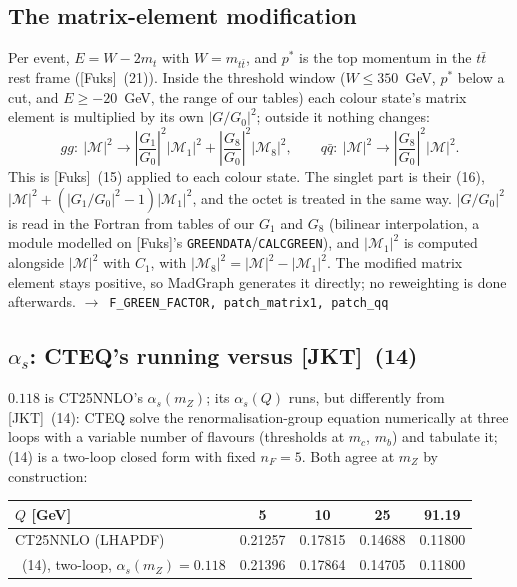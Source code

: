\documentclass[11pt]{article}
\newcommand{\code}[1]{\texttt{#1}}
\newcommand{\alphas}{\alpha_s}
\newcommand{\JKT}{[JKT]}
\newcommand{\Fuks}{[Fuks]}
\newcommand{\fn}[1]{\hfill$\to$~\code{#1}}
\begin{document}
\subsection{The matrix-element modification}
Per event, $E=W-2m_t$ with $W=m_{t\bar t}$, and $p^*$ is the top momentum in the $t\bar t$ rest frame (\Fuks\ (21)). Inside the
threshold window ($W\le350$~GeV, $p^*$ below a cut, and $E\ge-20$~GeV, the range of our tables) each colour state's matrix
element is multiplied by its own $|G/G_0|^2$; outside it nothing changes:
$$
gg:\ |\mathcal M|^2\to\left|\frac{G_1}{G_0}\right|^2|\mathcal M_1|^2+\left|\frac{G_8}{G_0}\right|^2|\mathcal M_8|^2,\qquad
q\bar q:\ |\mathcal M|^2\to\left|\frac{G_8}{G_0}\right|^2|\mathcal M|^2 .
$$
This is \Fuks\ (15) applied to each colour state. The singlet part is their (16), $|\mathcal M|^2+(|G_1/G_0|^2-1)|\mathcal M_1|^2$,
and the octet is treated in the same way. $|G/G_0|^2$ is read in the Fortran from tables of our $G_1$ and $G_8$ (bilinear
interpolation, a module modelled on \Fuks's \code{GREENDATA}/\code{CALCGREEN}), and $|\mathcal M_1|^2$ is computed alongside
$|\mathcal M|^2$ with $C_1$, with $|\mathcal M_8|^2=|\mathcal M|^2-|\mathcal M_1|^2$. The modified matrix element stays positive, so
MadGraph generates it directly; no reweighting is done afterwards. \fn{F\_GREEN\_FACTOR, patch\_matrix1, patch\_qq}

\subsection{$\alpha_s$: CTEQ's running versus \JKT\ (14)}
$0.118$ is CT25NNLO's $\alpha_s(m_Z)$; its $\alpha_s(Q)$ runs, but differently from \JKT\ (14): CTEQ solve the renormalisation-group
equation numerically at three loops with a variable number of flavours (thresholds at $m_c$, $m_b$) and tabulate it; (14) is a
two-loop closed form with fixed $n_F=5$. Both agree at $m_Z$ by construction:

\begin{center}\small
\begin{tabular}{@{}lcccc@{}}
\toprule
$Q$ [GeV] & 5 & 10 & 25 & 91.19\\
\midrule
CT25NNLO (LHAPDF) & 0.21257 & 0.17815 & 0.14688 & 0.11800\\
\JKT\ (14), two-loop, $\alphas(m_Z)=0.118$ & 0.21396 & 0.17864 & 0.14705 & 0.11800\\
\bottomrule
\end{tabular}
\end{center}
\end{document}
